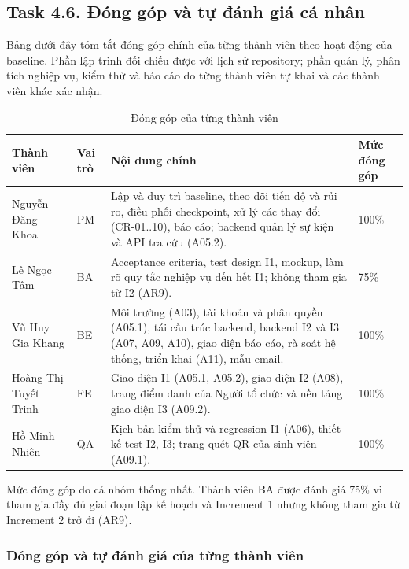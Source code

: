 \subsection{Task 4.6. Đóng góp và tự đánh giá cá nhân}
\label{sec:t4-individual}

Bảng dưới đây tóm tắt đóng góp chính của từng thành viên theo hoạt động của baseline. Phần lập trình đối chiếu được với lịch sử repository; phần quản lý, phân tích nghiệp vụ, kiểm thử và báo cáo do từng thành viên tự khai và các thành viên khác xác nhận.

\begin{table}[H]
\centering\small
\caption{Đóng góp của từng thành viên}\label{tab:t4-contrib}
\begin{tabularx}{\linewidth}{@{}p{.20\linewidth}p{.07\linewidth}Xp{.10\linewidth}@{}}
\toprule
\textbf{Thành viên} & \textbf{Vai trò} & \textbf{Nội dung chính} & \textbf{Mức đóng góp}\\\midrule
Nguyễn Đăng Khoa & PM & Lập và duy trì baseline, theo dõi tiến độ và rủi ro, điều phối checkpoint, xử lý các thay đổi (CR-01..10), báo cáo; backend quản lý sự kiện và API tra cứu (A05.2). & 100\%\\
Lê Ngọc Tâm & BA & Acceptance criteria, test design I1, mockup, làm rõ quy tắc nghiệp vụ đến hết I1; không tham gia từ I2 (AR9). & 75\%\\
Vũ Huy Gia Khang & BE & Môi trường (A03), tài khoản và phân quyền (A05.1), tái cấu trúc backend, backend I2 và I3 (A07, A09, A10), giao diện báo cáo, rà soát hệ thống, triển khai (A11), mẫu email. & 100\%\\
Hoàng Thị Tuyết Trinh & FE & Giao diện I1 (A05.1, A05.2), giao diện I2 (A08), trang điểm danh của Người tổ chức và nền tảng giao diện I3 (A09.2). & 100\%\\
Hồ Minh Nhiên & QA & Kịch bản kiểm thử và regression I1 (A06), thiết kế test I2, I3; trang quét QR của sinh viên (A09.1). & 100\%\\
\bottomrule
\end{tabularx}
\end{table}

Mức đóng góp do cả nhóm thống nhất. Thành viên BA được đánh giá 75\% vì tham gia đầy đủ giai đoạn lập kế hoạch và Increment 1 nhưng không tham gia từ Increment 2 trở đi (AR9).

\subsubsection{Đóng góp và tự đánh giá của từng thành viên}

